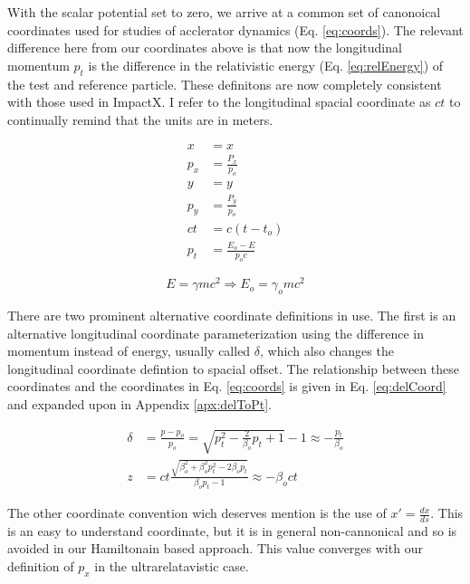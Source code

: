 With the scalar potential set to zero, we arrive at a common set of canonoical coordinates used for studies of acclerator dynamics (Eq. \ref{eq:coords}). The relevant difference here from our coordinates above is that now the longitudinal momentum $p_t$ is the difference in the relativistic energy (Eq. \ref{eq:relEnergy}) of the test and reference particle. These definitons are now completely consistent with those used in ImpactX. I refer to the longitudinal spacial coordinate as $ct$ to continually remind that the units are in meters.

\begin{equation} \label{eq:coords}
\begin{split}
x &= x\\
p_x &= \frac{P_x}{p_o}\\
y &= y\\
p_y &= \frac{P_y}{p_o}\\
ct &= c(t-t_o)\\
p_t &= \frac{E_o-E}{p_o c}
\end{split}
\end{equation}

\begin{equation} \label{eq:relEnergy}
	E = \gamma m c^2 \Rightarrow E_o = \gamma_o m c^2
\end{equation}

There are two prominent alternative coordinate definitions in use. The first is an alternative longitudinal coordinate parameterization using the difference in momentum instead of energy, usually called $\delta$, which also changes the longitudinal coordinate defintion to spacial offset. The relationship between these coordinates and the coordinates in Eq. \ref{eq:coords} is given in Eq. \ref{eq:delCoord} and expanded upon in Appendix \ref{apx:delToPt}.

\begin{equation} \label{eq:delCoord}
\begin{split}
	\delta &= \frac{p-p_o}{p_o} = \sqrt{p_t^2 -\frac{2}{\beta_o}p_t + 1} -1 \approx -\frac{p_t}{\beta_o}\\
	z &= ct\frac{\sqrt{\beta_o^2 + \beta_o^2 p_t^2 - 2\beta_o p_t}}{\beta_o p_t - 1} \approx  - \beta_o c t
\end{split}
\end{equation}

The other coordinate convention wich deserves mention is the use of $x' = \frac{dx}{ds}$. This is an easy to understand coordinate, but it is in general non-cannonical and so is avoided in our Hamiltonain based approach. This value converges with our definition of $p_x$ in the ultrarelatavistic case.

